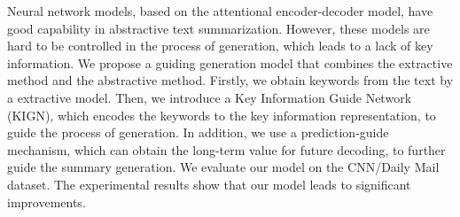 Neural network models, based on the attentional encoder-decoder model, have good capability in abstractive text summarization. However, these models are hard to be controlled in the process of generation, which leads to a lack of key information. We propose a guiding generation model that combines the extractive method and the abstractive method. Firstly, we obtain keywords from the text by a extractive model. Then, we introduce a Key Information Guide Network (KIGN), which encodes the keywords to the key information representation, to guide the process of generation. In addition, we use a prediction-guide mechanism, which can obtain the long-term value for future decoding, to further guide the summary generation. We evaluate our model on the CNN/Daily Mail dataset. The experimental results show that our model leads to significant improvements.
